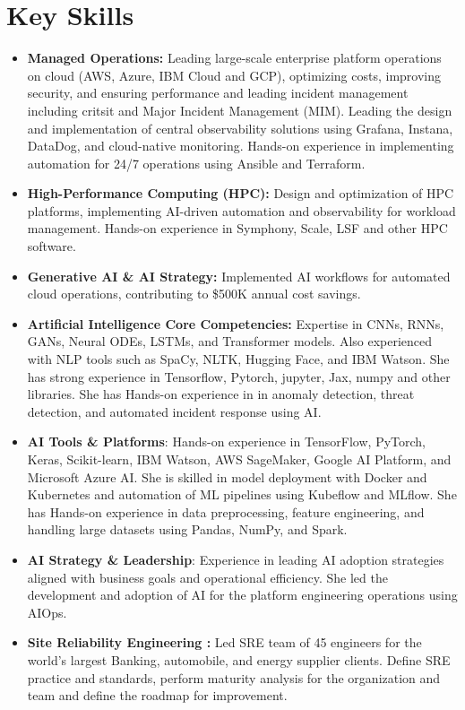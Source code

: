 \documentclass[12pt,]{scrartcl}
\begin{document}
\section*{Key Skills}
\begin{itemize}

    \item \textbf{Managed Operations:} Leading large-scale enterprise platform operations on cloud (AWS, Azure, IBM Cloud and GCP), optimizing costs, improving security, and ensuring performance and leading incident management including critsit and Major Incident Management (MIM). Leading the design and implementation of central observability solutions using Grafana, Instana, DataDog, and cloud-native monitoring. Hands-on experience in implementing automation for 24/7 operations using Ansible and Terraform.
    \item \textbf{High-Performance Computing (HPC):} Design and optimization of HPC platforms, implementing AI-driven automation and observability for workload management. Hands-on experience in Symphony, Scale, LSF and other HPC software.
    \item \textbf{Generative AI \& AI Strategy:} Implemented AI workflows for automated cloud operations, contributing to \$500K annual cost savings.
    \item \textbf{Artificial Intelligence Core Competencies:} Expertise in CNNs, RNNs, GANs, Neural ODEs, LSTMs, and Transformer models. Also experienced with NLP tools such as SpaCy, NLTK, Hugging Face, and IBM Watson. She has strong experience in Tensorflow, Pytorch, jupyter, Jax, numpy and other libraries. She has Hands-on experience in in anomaly detection, threat detection, and automated incident response using AI.
    \item \textbf{AI Tools \& Platforms}: Hands-on experience in TensorFlow, PyTorch, Keras, Scikit-learn,  IBM Watson, AWS SageMaker, Google AI Platform, and Microsoft Azure AI. She is skilled in model deployment with Docker and Kubernetes and automation of ML pipelines using Kubeflow and MLflow. She has Hands-on experience in data preprocessing, feature engineering, and handling large datasets using Pandas, NumPy, and Spark.
    \item \textbf{AI Strategy \& Leadership}: Experience in leading AI adoption strategies aligned with business goals and operational efficiency. She led the development and adoption of AI for the platform engineering operations using AIOps. 

    \item \textbf{Site Reliability Engineering :} Led SRE team of 45 engineers for the world's largest Banking, automobile, and energy supplier clients. Define SRE practice and standards, perform maturity analysis for the organization and team and define the roadmap for improvement.   
    

\end{itemize}
\end{document}
